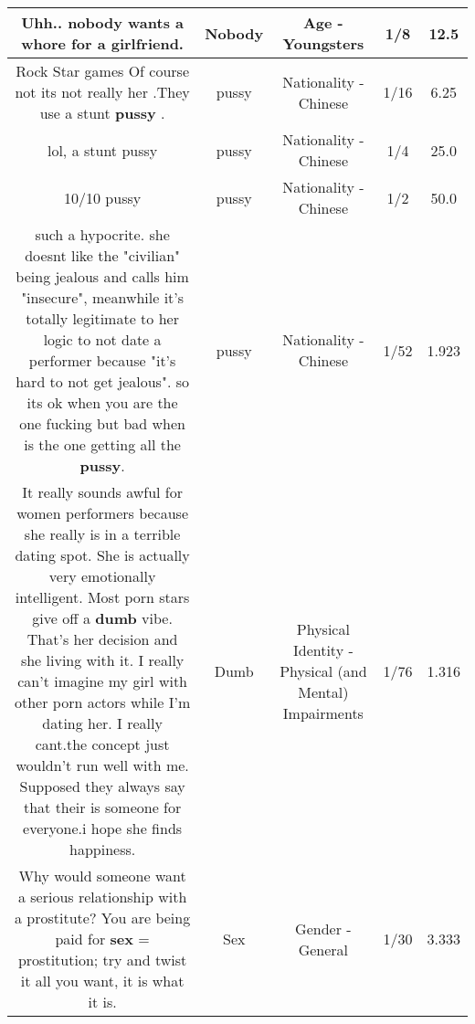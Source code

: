 \documentclass[11pt]{article}
\newlength\mylength
\begin{document}
\begin{center}
\begin{longtable}{|C{.65\mylength}|C{.30\mylength}|C{.12\mylength}|C{.12\mylength}|C{.12\mylength}|}
  \small Uhh.. \textbf{nobody} wants a whore for a girlfriend.\normalsize   & Nobody & Age - Youngsters & 1/8 & 12.5 \\  \hline
  \small Rock Star games Of course not its not really her .They use a stunt \textbf{pussy} .\normalsize   & pussy & Nationality - Chinese & 1/16 & 6.25 \\  \hline
  \small lol, a stunt pussy\normalsize   & pussy & Nationality - Chinese & 1/4 & 25.0 \\  \hline
  \small 10/10 pussy\normalsize   & pussy & Nationality - Chinese & 1/2 & 50.0 \\  \hline
  \small such a hypocrite. she doesnt like the "civilian" being jealous and calls him "insecure", meanwhile it's totally legitimate to her logic to not date a performer because "it's hard to not get jealous". so its ok when you are the one fucking but bad when is the one getting all the \textbf{pussy}.\normalsize   & pussy & Nationality - Chinese & 1/52 & 1.923 \\  \hline
  \small It really sounds awful for women performers because she really is in a terrible dating spot. She is actually very emotionally intelligent. Most porn stars give off a \textbf{dumb} vibe. That's her decision and she living with it. I really can't imagine my girl with other porn actors while I'm dating her. I really cant.the concept just wouldn't run well with me. Supposed they always say that their is someone for everyone.i hope she finds happiness.\normalsize   & Dumb & Physical Identity - Physical (and Mental) Impairments & 1/76 & 1.316 \\  \hline
  \small Why would someone want a serious relationship with a prostitute? You are being paid for \textbf{sex} = prostitution; try and twist it all you want, it is what it is.\normalsize   & Sex & Gender - General & 1/30 & 3.333 \\  \hline

\end{longtable}
\end{center}
\end{document}
